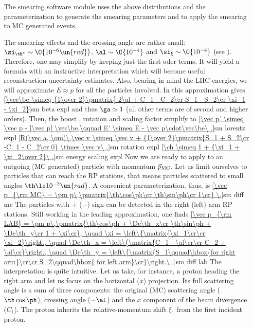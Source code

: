 The smearing software module uses the above distributions and the parameterization  to generate the smearing parameters and  to apply the smearing to MC generated events.

The smearing effects and the crossing angle are rather small: $\si_{\th^*} \sim \O{10^{-6}\un{rad}}$, $\al \sim \O{10^{-4}}$ and $\si_\xi \sim \O{10^{-4}}$ (see ). Therefore, one may simplify  by keeping just the first oder terms. It will yield a formula with an instructive interpretation which will become useful reconstruction-uncertainty estimates. Also, bearing in mind the LHC energies, we will approximate $E\approx p$ for all the particles involved. In this approximation  gives
\eqref{\vec\be \simeq {1\over 2}\pmatrix{-2\al + C_1 - C_2\cr S_1 - S_2\cr \xi_1 - \xi_2}}{sm beta expl}
and thus $\ga\simeq 1$ (all other terms are of second and higher orders). Then, the boost , rotation  and scaling factor  simplify to
\eqref{\vec p' \simeq \vec p - |\vec p| \vec\be,\qquad E' \simeq E - \vec p\cdot\vec\be\ ,}{sm lorentz expl}
\eqref{R(\vec a, \om)\,\vec v \simeq \vec v + {1\over 2}\pmatrix{S_1 + S_2\cr -C_1 - C_2\cr 0} \times \vec v\ ,}{sm rotation expl}
\eqref{\ch \simeq 1 + {\xi_1 + \xi_2\over 2}\ .}{sm energy scaling expl}
Now we are ready to apply  to an outgoing (MC generated) particle with momentum $\vec p_{\rm MC}$. Let us limit ourselves to particles that can reach the RP stations, that means particles scattered to small angles $\th \ls 10^{-3}\un{rad}$. A convenient parameterization, thus, is
\eqref{\vec p_{\rm MC} = \pm p\,\pmatrix{\th\cos\ph\cr \th\sin\ph\cr 1\cr} \.}{sm diff mc}
The particles with $+$ ($-$) sign can be detected in the right (left) arm RP stations. Still working in the leading approximation, one finds
\eqref{\vec p_{\rm LAB} = \pm p\,\pmatrix{\th\cos\ph + \De\th_x\cr \th\sin\ph + \De\th_y\cr 1 + \xi\cr},
\quad \xi = \left\{\matrix{\xi_1\cr\cr \xi_2}\right.,
\quad \De\th_x = \left\{\matrix{C_1 - \al\cr\cr C_2 + \al\cr}\right.,
\quad \De\th_y = \left\{\matrix{S_1\qquad\hbox{for right arm}\cr\cr S_2\qquad\hbox{ for left arm}\cr}\right.\ .}{sm diff lab} %
The interpretation is quite intuitive. Let us take, for instance, a proton heading the right arm and let us focus on the horizontal ($x$) projection. Its full scattering angle is a sum of three components: the original (MC) scattering angle ($\th\cos\ph$), crossing angle ($-\al$) and the $x$ component of the beam divergence ($C_1$). The proton inherits the relative-momentum shift $\xi_1$ from the first incident proton.


